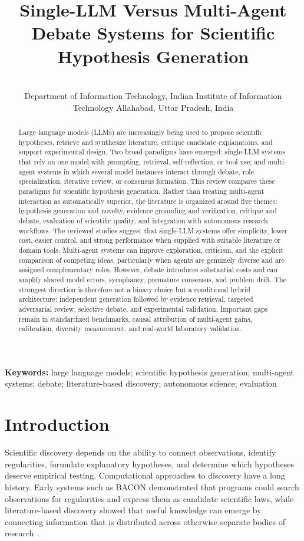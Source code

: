\documentclass[11pt]{article}
\title{Single-LLM Versus Multi-Agent Debate Systems for Scientific Hypothesis Generation}
\author{
  \parbox{0.9\textwidth}{\centering
    \mbox{}\\
    Department of Information Technology, Indian Institute of Information Technology Allahabad, Uttar Pradesh, India
  }
}
\date{}
\begin{document}
\maketitle

\begin{abstract}
Large language models (LLMs) are increasingly being used to propose scientific hypotheses,
retrieve and synthesize literature, critique candidate explanations, and support experimental design.
Two broad paradigms have emerged: single-LLM systems that rely on one model with prompting,
retrieval, self-reflection, or tool use; and multi-agent systems in which several model instances
interact through debate, role specialization, iterative review, or consensus formation. This review
compares these paradigms for scientific hypothesis generation. Rather than treating multi-agent
interaction as automatically superior, the literature is organized around five themes: hypothesis
generation and novelty, evidence grounding and verification, critique and debate, evaluation of
scientific quality, and integration with autonomous research workflows. The reviewed studies
suggest that single-LLM systems offer simplicity, lower cost, easier control, and strong
performance when supplied with suitable literature or domain tools. Multi-agent systems can
improve exploration, criticism, and the explicit comparison of competing ideas, particularly when
agents are genuinely diverse and are assigned complementary roles. However, debate introduces
substantial costs and can amplify shared model errors, sycophancy, premature consensus, and
problem drift. The strongest direction is therefore not a binary choice but a conditional hybrid
architecture: independent generation followed by evidence retrieval, targeted adversarial review,
selective debate, and experimental validation. Important gaps remain in standardized benchmarks,
causal attribution of multi-agent gains, calibration, diversity measurement, and real-world
laboratory validation.
\end{abstract}

\noindent\textbf{Keywords:} large language models; scientific hypothesis generation; multi-agent systems; debate;
literature-based discovery; autonomous science; evaluation

\section{Introduction}
\label{sec:introduction}

Scientific discovery depends on the ability to connect observations, identify regularities, formulate
explanatory hypotheses, and determine which hypotheses deserve empirical testing. Computational
approaches to discovery have a long history. Early systems such as BACON demonstrated that
programs could search observations for regularities and express them as candidate scientific laws,
while literature-based discovery showed that useful knowledge can emerge by connecting
information that is distributed across otherwise separate bodies of research
\cite{swanson1986undiscovered,langley1987scientific}.
\end{document}
